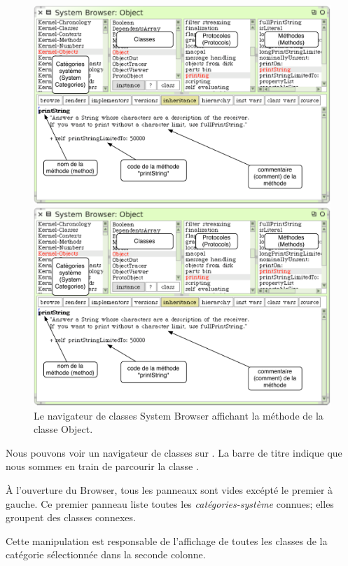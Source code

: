 \documentclass[a4paper,10pt,twoside]{book}
\begin{document}
\begin{figure}[htb]
\ifluluelse
	{\centerline {\includegraphics[width=\textwidth]{ClassBrowser1}}}
	{\centerline {\includegraphics[scale=0.7]{ClassBrowser1}}}
\caption{Le navigateur de classes System Browser affichant la
  m\'ethode  de la classe Object.
\label{fig:classBrowser}}
\end{figure}

Nous pouvons voir un navigateur de classes sur .
La barre de titre indique que nous sommes en train de parcourir la
classe .

\`A l'ouverture du Browser, tous les panneaux sont vides exc\'ept\'e
le premier \`a gauche.
Ce premier panneau liste toutes les \emph{cat\'egories-syst\`eme}
connues; elles groupent des classes connexes.

Cette manipulation est responsable de l'affichage de toutes les
classes de la cat\'egorie s\'electionn\'ee dans la seconde colonne.
\end{document}
